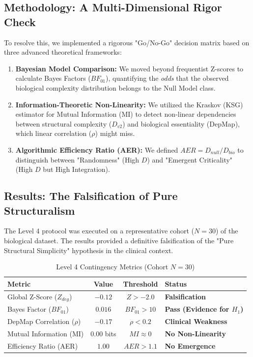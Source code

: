 \documentclass{article}
\begin{document}
\subsection{Methodology: A Multi-Dimensional Rigor Check}
To resolve this, we implemented a rigorous "Go/No-Go" decision matrix based on three advanced theoretical frameworks:

\begin{enumerate}
    \item \textbf{Bayesian Model Comparison:} We moved beyond frequentist Z-scores to calculate Bayes Factors ($BF_{01}$), quantifying the \textit{odds} that the observed biological complexity distribution belongs to the Null Model class.
    \item \textbf{Information-Theoretic Non-Linearity:} We utilized the Kraskov (KSG) estimator for Mutual Information (MI) to detect non-linear dependencies between structural complexity ($D_{v2}$) and biological essentiality (DepMap), which linear correlation ($\rho$) might miss.
    \item \textbf{Algorithmic Efficiency Ratio (AER):} We defined $AER = D_{null} / D_{bio}$ to distinguish between "Randomness" (High $D$) and "Emergent Criticality" (High $D$ but High Integration).
\end{enumerate}

\subsection{Results: The Falsification of Pure Structuralism}
The Level 4 protocol was executed on a representative cohort ($N=30$) of the biological dataset. The results provided a definitive falsification of the "Pure Structural Simplicity" hypothesis in the clinical context.

\begin{table}[H]
\centering
\caption{Level 4 Contingency Metrics (Cohort $N=30$)}
\label{tab:lev4_metrics}
\begin{tabular}{@{}l c c l@{}}
\toprule
\textbf{Metric} & \textbf{Value} & \textbf{Threshold} & \textbf{Status} \\ \midrule
Global Z-Score ($Z_{deg}$) & $-0.12$ & $Z > -2.0$ & \textbf{Falsification} \\
Bayes Factor ($BF_{01}$) & $0.016$ & $BF_{01} > 10$ & \textbf{Pass (Evidence for $H_1$)} \\
DepMap Correlation ($\rho$) & $-0.17$ & $\rho < 0.2$ & \textbf{Clinical Weakness} \\
Mutual Information (MI) & $0.00$ bits & $MI \approx 0$ & \textbf{No Non-Linearity} \\
Efficiency Ratio (AER) & $1.00$ & $AER > 1.1$ & \textbf{No Emergence} \\ \bottomrule
\end{tabular}
\end{table}
\end{document}
